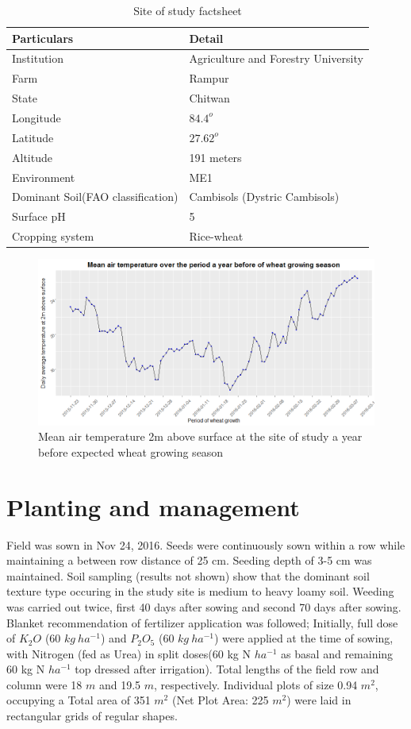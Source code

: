 \documentclass[12pt,oneside]{dukestatscithesis} %
\theoremstyle{definition}
\theoremstyle{definition}
\theoremstyle{definition}
\theoremstyle{remark}
\begin{document}
\small{
\begin{longtable}[]{@{}ll@{}}
\caption{\label{tab:site-fact-tab}Site of study factsheet}\\
\toprule
\textbf{Particulars} & \textbf{Detail}\tabularnewline
\midrule
\endhead
Institution & Agriculture and Forestry University\tabularnewline
Farm & Rampur\tabularnewline
State & Chitwan\tabularnewline
Longitude & \(84.4^o\)\tabularnewline
Latitude & \(27.62^o\)\tabularnewline
Altitude & 191 meters\tabularnewline
Environment & ME1\tabularnewline
Dominant Soil(FAO classification) & Cambisols (Dystric
Cambisols)\tabularnewline
Surface pH & 5\tabularnewline
Cropping system & Rice-wheat\tabularnewline
\bottomrule
\end{longtable}
}
\begin{figure}

{\centering \includegraphics[width=0.9\linewidth]{./images/mean_air_temp_a_year_before} 

}

\caption{Mean air temperature 2m above surface at the site of study a year before expected wheat growing season}\label{fig:weather-previous}
\end{figure}
\setlength{\baselineskip}{1.5\baselineskip}

\section{Planting and management}\label{planting-and-management}

Field was sown in Nov 24, 2016. Seeds were continuously sown within a
row while maintaining a between row distance of 25 cm. Seeding depth of
3-5 cm was maintained. Soil sampling (results not shown) show that the
dominant soil texture type occuring in the study site is medium to heavy
loamy soil. Weeding was carried out twice, first 40 days after sowing
and second 70 days after sowing. Blanket recommendation of fertilizer
application was followed; Initially, full dose of \(K_2O\) (60
\(kg\ ha^{-1}\)) and \(P_2O_5\) (60 \(kg\ ha^{-1}\)) were applied at the
time of sowing, with Nitrogen (fed as Urea) in split doses(60 kg N
\(ha^{-1}\) as basal and remaining 60 kg N \(ha^{-1}\) top dressed after
irrigation). Total lengths of the field row and column were 18 \(m\) and
19.5 \(m\), respectively. Individual plots of size 0.94 \(m^2\),
occupying a Total area of 351 \(m^2\) (Net Plot Area: 225 \(m^2\)) were
laid in rectangular grids of regular shapes.
\end{document}
